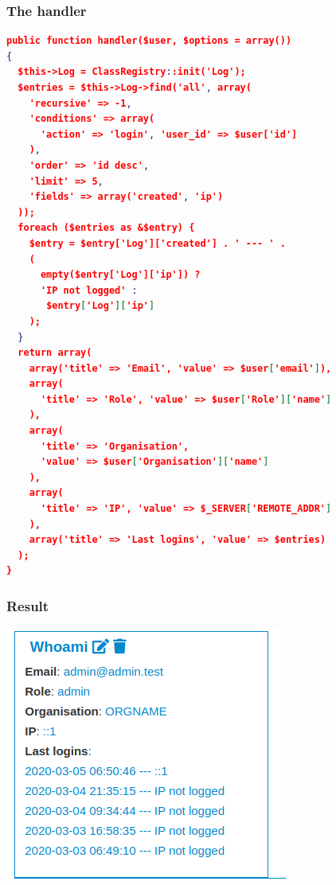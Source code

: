 \begin{frame}[fragile]
  \frametitle{The handler}
    \begin{adjustbox}{height=4cm,keepaspectratio}
        \begin{lstlisting}[language=json,firstnumber=1]
public function handler($user, $options = array())
{
  $this->Log = ClassRegistry::init('Log');
  $entries = $this->Log->find('all', array(
    'recursive' => -1,
    'conditions' => array(
      'action' => 'login', 'user_id' => $user['id']
    ),
    'order' => 'id desc',
    'limit' => 5,
    'fields' => array('created', 'ip')
  ));
  foreach ($entries as &$entry) {
    $entry = $entry['Log']['created'] . ' --- ' .
    (
      empty($entry['Log']['ip']) ?
      'IP not logged' :
       $entry['Log']['ip']
    );
  }
  return array(
    array('title' => 'Email', 'value' => $user['email']),
    array(
      'title' => 'Role', 'value' => $user['Role']['name']
    ),
    array(
      'title' => 'Organisation',
      'value' => $user['Organisation']['name']
    ),
    array(
      'title' => 'IP', 'value' => $_SERVER['REMOTE_ADDR']
    ),
    array('title' => 'Last logins', 'value' => $entries)
  );
}
        \end{lstlisting}
    \end{adjustbox}
\end{frame}

\begin{frame}
  \frametitle{Result}
  \begin{center}
    \includegraphics[scale=0.5]{whoami.png}
  \end{center}
\end{frame}

